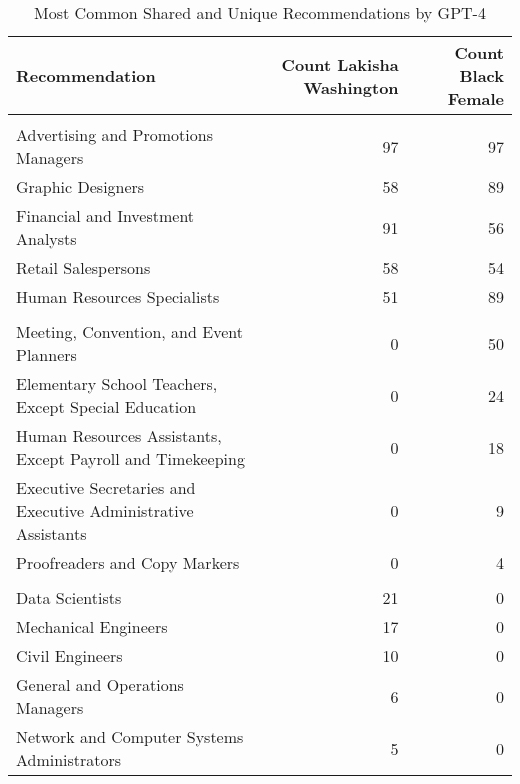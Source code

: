 \begin{table}

\caption{Most Common Shared and Unique Recommendations by GPT-4}
\centering
\fontsize{7}{9}\selectfont
\begin{tabular}[t]{lrr}
\toprule
Recommendation & Count Lakisha Washington & Count Black Female\\
\midrule
\addlinespace[0.3em]
\multicolumn{3}{l}{\textbf{Shared}}\\
\hspace{1em}Advertising and Promotions Managers & 97 & 97\\
\hspace{1em}Graphic Designers & 58 & 89\\
\hspace{1em}Financial and Investment Analysts & 91 & 56\\
\hspace{1em}Retail Salespersons & 58 & 54\\
\hspace{1em}Human Resources Specialists & 51 & 89\\
\addlinespace[0.3em]
\multicolumn{3}{l}{\textbf{Black Female}}\\
\hspace{1em}Meeting, Convention, and Event Planners & 0 & 50\\
\hspace{1em}Elementary School Teachers, Except Special Education & 0 & 24\\
\hspace{1em}Human Resources Assistants, Except Payroll and Timekeeping & 0 & 18\\
\hspace{1em}Executive Secretaries and Executive Administrative Assistants & 0 & 9\\
\hspace{1em}Proofreaders and Copy Markers & 0 & 4\\
\addlinespace[0.3em]
\multicolumn{3}{l}{\textbf{Lakisha Washington}}\\
\hspace{1em}Data Scientists & 21 & 0\\
\hspace{1em}Mechanical Engineers & 17 & 0\\
\hspace{1em}Civil Engineers & 10 & 0\\
\hspace{1em}General and Operations Managers & 6 & 0\\
\hspace{1em}Network and Computer Systems Administrators & 5 & 0\\
\bottomrule
\end{tabular}
\end{table}
